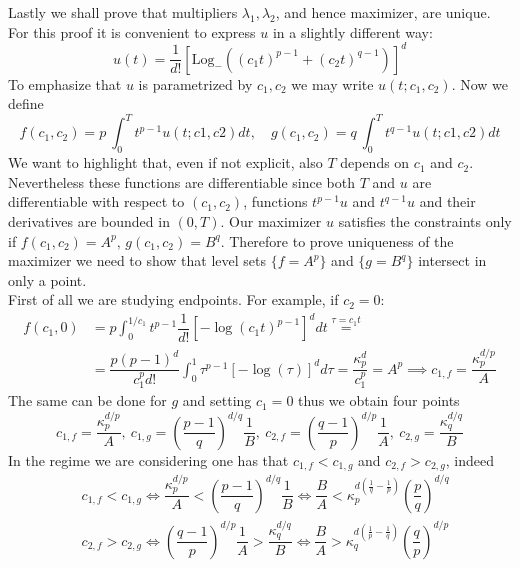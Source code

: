\documentclass[corpo=11pt, stile=classica, tipotesi=custom,
greek, evenboxes, english]{toptesi}
\numberwithin{equation}{chapter}
\newcommand{\Log}{\ensuremath{\text{Log}_-}}
\begin{document}
Lastly we shall prove that multipliers $\lambda_1, \lambda_2$, and hence maximizer, are unique. For this proof it is convenient to express $u$ in a slightly different way:
\begin{equation*}
	u(t) = \dfrac{1}{d!}\left[ \Log\left((c_1t)^{p-1} + (c_2t)^{q-1}\right) \right]^d
\end{equation*} 
To emphasize that $u$ is parametrized by $c_1, c_2$ we may write $u(t;c_1,c_2)$. Now we define
\begin{equation*}
	f(c_1,c_2) = p\ \int_0^T t^{p-1}u(t;c1,c2)dt, \quad g(c_1,c_2) = q\ \int_0^T t^{q-1}u(t;c1,c2)dt
\end{equation*}
We want to highlight that, even if not explicit, also $T$ depends on $c_1$ and $c_2$. Nevertheless these functions are differentiable since both $T$ and $u$ are differentiable with respect to $(c_1,c_2)$, functions $t^{p-1}u$ and $t^{q-1}u$ and their derivatives are bounded in $(0,T)$. 
Our maximizer $u$ satisfies the constraints only if $f(c_1,c_2)=A^p, \, g(c_1,c_2) = B^q$. Therefore to prove uniqueness of the maximizer we need to show that level sets $\{f=A^p\}$ and $\{g=B^q\}$ intersect in only a point.\\
First of all we are studying endpoints. For example, if $c_2=0$:
\begin{align*}
	f(c_1,0) &= p\int_0^{1/{c_1}} t^{p-1}\dfrac{1}{d!}\left[-\log(c_1t)^{p-1}\right]^d dt \overset{\tau = c_1t}{=} \\
			 &= \dfrac{p(p-1)^d}{c_1^p d!}\int_0^1 \tau^{p-1}\left[-\log(\tau)\right]^d d\tau = \dfrac{\kappa_p^d}{c_1^p} = A^p \implies c_{1,f} = \dfrac{\kappa_p^{d/p}}{A}
\end{align*}
The same can be done for $g$ and setting $c_1=0$ thus we obtain four points
\begin{equation*}
	c_{1,f} = \dfrac{\kappa_p^{d/p}}{A},\ c_{1,g} = \left(\dfrac{p-1}{q}\right)^{d/q}\dfrac1{B},\ c_{2,f} = \left(\dfrac{q-1}{p}\right)^{d/p}\dfrac1{A},\ c_{2,g} = \dfrac{\kappa_q^{d/q}}{B}
\end{equation*}
In the regime we are considering one has that $c_{1,f} < c_{1,g}$ and $c_{2,f} > c_{2,g}$, indeed
\begin{align*}
	&c_{1,f} < c_{1,g} \iff \dfrac{\kappa_p^{d/p}}{A} < \left(\dfrac{p-1}{q}\right)^{d/q}\dfrac1{B} \iff \dfrac{B}{A} < \kappa_p^{d\left( \frac1{q}-\frac1{p}\right)}\left(\dfrac{p}{q}\right)^{d/q}\\
	&c_{2,f} > c_{2,g} \iff \left(\dfrac{q-1}{p}\right)^{d/p}\dfrac1{A} > \dfrac{\kappa_q^{d/q}}{B} \iff \dfrac{B}{A} > \kappa_q^{d\left( \frac1{p}-\frac1{q}\right)}\left(\dfrac{q}{p}\right)^{d/p}
\end{align*}
\end{document}
